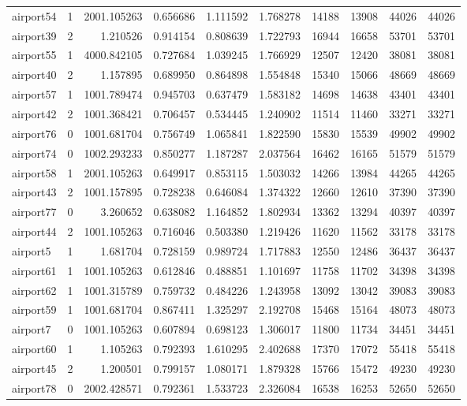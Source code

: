 \begin{longtable}{|l|r|r|r|r|r|r|r|r|r|}
airport54 & 1 & 2001.105263 & 0.656686 & 1.111592 & 1.768278 & 14188 & 13908 & 44026 & 44026 \\
airport39 & 2 & 1.210526 & 0.914154 & 0.808639 & 1.722793 & 16944 & 16658 & 53701 & 53701 \\
airport55 & 1 & 4000.842105 & 0.727684 & 1.039245 & 1.766929 & 12507 & 12420 & 38081 & 38081 \\
airport40 & 2 & 1.157895 & 0.689950 & 0.864898 & 1.554848 & 15340 & 15066 & 48669 & 48669 \\
airport57 & 1 & 1001.789474 & 0.945703 & 0.637479 & 1.583182 & 14698 & 14638 & 43401 & 43401 \\
airport42 & 2 & 1001.368421 & 0.706457 & 0.534445 & 1.240902 & 11514 & 11460 & 33271 & 33271 \\
airport76 & 0 & 1001.681704 & 0.756749 & 1.065841 & 1.822590 & 15830 & 15539 & 49902 & 49902 \\
airport74 & 0 & 1002.293233 & 0.850277 & 1.187287 & 2.037564 & 16462 & 16165 & 51579 & 51579 \\
airport58 & 1 & 2001.105263 & 0.649917 & 0.853115 & 1.503032 & 14266 & 13984 & 44265 & 44265 \\
airport43 & 2 & 1001.157895 & 0.728238 & 0.646084 & 1.374322 & 12660 & 12610 & 37390 & 37390 \\
airport77 & 0 & 3.260652 & 0.638082 & 1.164852 & 1.802934 & 13362 & 13294 & 40397 & 40397 \\
airport44 & 2 & 1001.105263 & 0.716046 & 0.503380 & 1.219426 & 11620 & 11562 & 33178 & 33178 \\
airport5 & 1 & 1.681704 & 0.728159 & 0.989724 & 1.717883 & 12550 & 12486 & 36437 & 36437 \\
airport61 & 1 & 1001.105263 & 0.612846 & 0.488851 & 1.101697 & 11758 & 11702 & 34398 & 34398 \\
airport62 & 1 & 1001.315789 & 0.759732 & 0.484226 & 1.243958 & 13092 & 13042 & 39083 & 39083 \\
airport59 & 1 & 1001.681704 & 0.867411 & 1.325297 & 2.192708 & 15468 & 15164 & 48073 & 48073 \\
airport7 & 0 & 1001.105263 & 0.607894 & 0.698123 & 1.306017 & 11800 & 11734 & 34451 & 34451 \\
airport60 & 1 & 1.105263 & 0.792393 & 1.610295 & 2.402688 & 17370 & 17072 & 55418 & 55418 \\
airport45 & 2 & 1.200501 & 0.799157 & 1.080171 & 1.879328 & 15766 & 15472 & 49230 & 49230 \\
airport78 & 0 & 2002.428571 & 0.792361 & 1.533723 & 2.326084 & 16538 & 16253 & 52650 & 52650 \\

\end{longtable}
